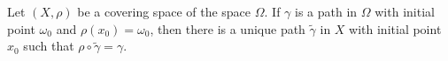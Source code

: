 Let $(X, \rho)$ be a covering space of the space $\Omega$. If $\gamma$ is a path in $\Omega$ with initial point $\omega_0$ and $\rho(x_0) = \omega_0$, then there is a unique path $\tilde{\gamma}$ in $X$ with initial point $x_0$ such that $\rho \circ \tilde{\gamma} = \gamma$.
